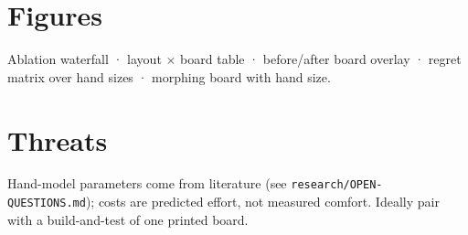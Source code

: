 \documentclass{gecko-paper}
\begin{document}
\begin{paperbody}
\section{Figures}

Ablation waterfall · layout $\times$ board table · before/after board overlay ·
regret matrix over hand sizes · morphing board with hand size.

\section{Threats}

Hand-model parameters come from literature (see
\texttt{research/OPEN-QUESTIONS.md}); costs are predicted effort, not
measured comfort. Ideally pair with a build-and-test of one printed
board.

\end{paperbody}
\end{document}
